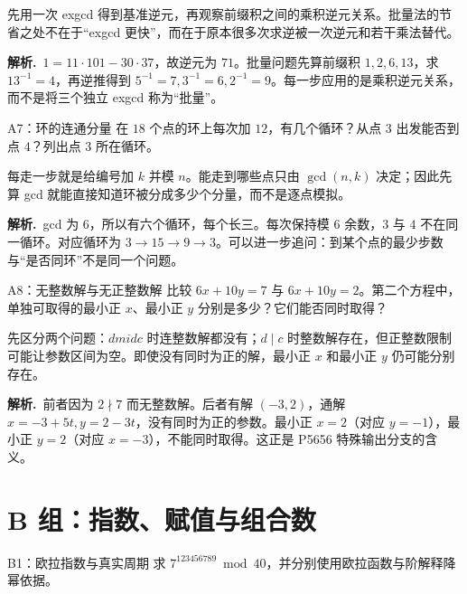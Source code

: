 \documentclass[UTF8,a4paper,11pt,twoside,openright,fontset=fandol]{ctexbook}
\theoremstyle{definition}
\newcommand{\sol}{\par\noindent\textbf{解析.}\ }
\begin{document}
\begin{pitfall}[讲解：先看这题到底在做什么]
先用一次 exgcd 得到基准逆元，再观察前缀积之间的乘积逆元关系。批量法的节省之处不在于“exgcd 更快”，而在于原本很多次求逆被一次逆元和若干乘法替代。
\end{pitfall}

\sol $1=11\cdot101-30\cdot37$，故逆元为 $71$。批量问题先算前缀积 $1,2,6,13$，求 $13^{-1}=4$，再逆推得到 $5^{-1}=7,3^{-1}=6,2^{-1}=9$。每一步应用的是乘积逆元关系，而不是将三个独立 exgcd 称为“批量”。


\begin{problem}{A7：环的连通分量}
在 $18$ 个点的环上每次加 $12$，有几个循环？从点 $3$ 出发能否到点 $4$？列出点 $3$ 所在循环。
\end{problem}

\begin{pitfall}[讲解：先看这题到底在做什么]
每走一步就是给编号加 $k$ 并模 $n$。能走到哪些点只由 $\gcd(n,k)$ 决定；因此先算 gcd 就能直接知道环被分成多少个分量，而不是逐点模拟。
\end{pitfall}

\sol gcd 为 $6$，所以有六个循环，每个长三。每次保持模 $6$ 余数，$3$ 与 $4$ 不在同一循环。对应循环为 $3\to15\to9\to3$。可以进一步追问：到某个点的最少步数与“是否同环”不是同一个问题。


\begin{problem}{A8：无整数解与无正整数解}
比较 $6x+10y=7$ 与 $6x+10y=2$。第二个方程中，单独可取得的最小正 $x$、最小正 $y$ 分别是多少？它们能否同时取得？
\end{problem}

\begin{pitfall}[讲解：先看这题到底在做什么]
先区分两个问题：$d
mid c$ 时连整数解都没有；$d\mid c$ 时整数解存在，但正整数限制可能让参数区间为空。即使没有同时为正的解，最小正 $x$ 和最小正 $y$ 仍可能分别存在。
\end{pitfall}

\sol 前者因为 $2\nmid7$ 而无整数解。后者有解 $(-3,2)$，通解 $x=-3+5t,y=2-3t$，没有同时为正的参数。最小正 $x=2$（对应 $y=-1$），最小正 $y=2$（对应 $x=-3$），不能同时取得。这正是 P5656 特殊输出分支的含义。


\section{B 组：指数、赋值与组合数}
\begin{problem}{B1：欧拉指数与真实周期}
求 $7^{123456789}\bmod40$，并分别使用欧拉函数与阶解释降幂依据。
\end{problem}
\end{document}
